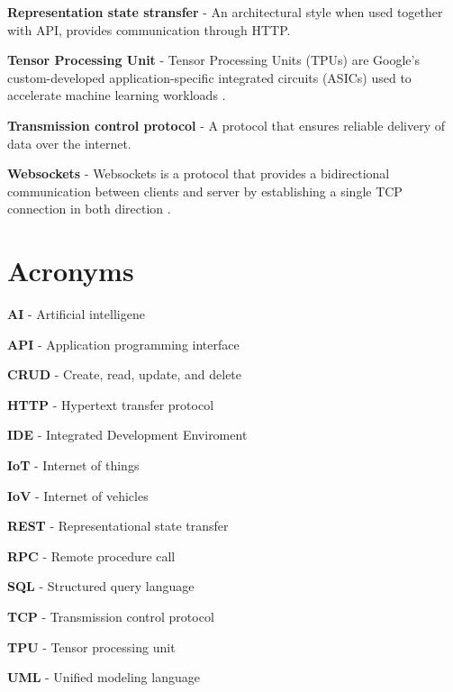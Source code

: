 \textbf{Representation state stransfer} - An architectural style when used together with API, provides communication through HTTP.

\textbf{Tensor Processing Unit} - Tensor Processing Units (TPUs) are Google’s custom-developed application-specific integrated circuits (ASICs) used to accelerate machine learning workloads \parencite{google_tpu}.

\textbf{Transmission control protocol} - A protocol that ensures reliable delivery of data over the internet.

\textbf{Websockets} - Websockets is a protocol that provides a bidirectional communication between clients and server by establishing a single TCP connection in both direction \parencite{rfc_websockets}.     

\section{Acronyms}
\textbf{AI} - Artificial intelligene

\textbf{API} - Application programming interface

\textbf{CRUD} - Create, read, update, and delete

\textbf{HTTP} - Hypertext transfer protocol

\textbf{IDE} - Integrated Development Enviroment

\textbf{IoT} - Internet of things

\textbf{IoV} - Internet of vehicles

\textbf{REST} - Representational state transfer

\textbf{RPC} - Remote procedure call 

\textbf{SQL} - Structured query language

\textbf{TCP} - Transmission control protocol

\textbf{TPU} - Tensor processing unit

\textbf{UML} - Unified modeling language